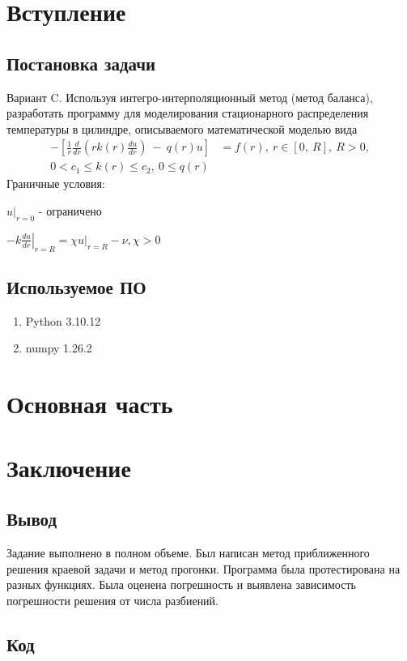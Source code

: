 \documentclass[a4paper,12pt]{article}
\begin{document}
	
	\newpage
	\tableofcontents
	\newpage

	\section{Вступление}
	\subsection{Постановка задачи}

	Вариант C. Используя интегро-интерполяционный метод (метод баланса), разработать программу для моделирования стационарного распределения температуры в цилиндре, описываемого математической моделью вида
	\begin{align*}
		-\left[ \frac{1}{r} \frac{d}{dr} \left(r k(r)\frac{du}{dr} \right)\ -\ q(r)u \right]
		&= f(r),\ r \in \left[ 0,\ R\right],\ R > 0,
		\\
		 0 < c_1 \leq k(r) \leq c_2,\ 0 \leq q(r)&
	\end{align*}
	Граничные условия: 
 
    \(\left. u\right\vert_{r = 0}\) - ограничено 
    
    \(-k \left. \frac{du}{dr}\right\vert_{r = R} = \chi\left.u\right\vert_{r = R} -\nu, \chi > 0\)
    
	\subsection{Используемое ПО}

	\begin{enumerate}
		\item Python 3.10.12
		\item numpy 1.26.2
	\end{enumerate}
	\newpage

	\section{Основная часть}
	

	
	\newpage

	
	\newpage

	
	\newpage

	\section{Заключение}
	\subsection{Вывод}
	Задание выполнено в полном объеме.
	Был написан метод приближенного решения краевой задачи и метод прогонки.
	Программа была протестирована на разных функциях.
	Была оценена погрешность и выявлена зависимость погрешности решения от числа разбиений.
	\newpage
	\subsection{Код}
	\inputminted{python}{main.py}
\end{document}
